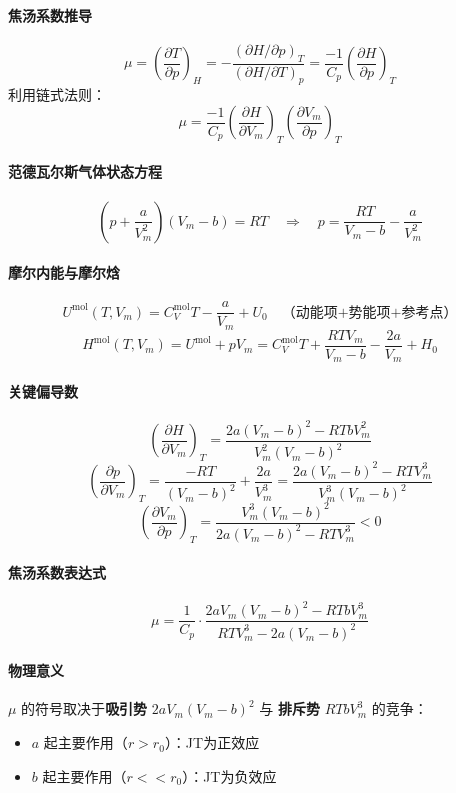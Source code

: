 \documentclass[UTF8]{ctexart}
\begin{document}
\paragraph{焦汤系数推导}
\[
\mu=\left(\frac{\partial T}{\partial p}\right)_H
=-\frac{(\partial H/\partial p)_T}{(\partial H/\partial T)_p}
=\frac{-1}{C_p}\left(\frac{\partial H}{\partial p}\right)_T
\]
利用链式法则：
\[
\mu=\frac{-1}{C_p}\left(\frac{\partial H}{\partial V_m}\right)_T
\left(\frac{\partial V_m}{\partial p}\right)_T
\]

\paragraph{范德瓦尔斯气体状态方程}
\[
\left(p+\frac{a}{V_m^2}\right)(V_m-b)=RT
\quad\Longrightarrow\quad
p=\frac{RT}{V_m-b}-\frac{a}{V_m^2}
\]

\paragraph{摩尔内能与摩尔焓}
\[
U^{\mathrm{mol}}(T,V_m)=C_V^{\mathrm{mol}}T-\frac{a}{V_m}+U_0
\quad\text{（动能项+势能项+参考点）}
\]
\[
H^{\mathrm{mol}}(T,V_m)=U^{\mathrm{mol}}+pV_m
=C_V^{\mathrm{mol}}T+\frac{RTV_m}{V_m-b}-\frac{2a}{V_m}+H_0
\]

\paragraph{关键偏导数}
\[
\left(\frac{\partial H}{\partial V_m}\right)_T
=\frac{2a(V_m-b)^2-RTbV_m^2}{V_m^2(V_m-b)^2}
\]
\[
\left(\frac{\partial p}{\partial V_m}\right)_T
=\frac{-RT}{(V_m-b)^2}+\frac{2a}{V_m^3}
=\frac{2a(V_m-b)^2-RTV_m^3}{V_m^3(V_m-b)^2}
\]
\[
\left(\frac{\partial V_m}{\partial p}\right)_T
=\frac{V_m^3(V_m-b)^2}{2a(V_m-b)^2-RTV_m^3}<0
\]

\paragraph{焦汤系数表达式}
\[
\boxed{\mu=\frac{1}{C_p}\cdot
\frac{2aV_m(V_m-b)^2-RTbV_m^3}{RTV_m^3-2a(V_m-b)^2}}
\]

\paragraph{物理意义}
$\mu$ 的符号取决于\textbf{吸引势} $2aV_m(V_m-b)^2$ 与 \textbf{排斥势} $RTbV_m^3$ 的竞争：
\begin{itemize}[leftmargin=2em]
  \item $a$ 起主要作用（$r>r_0$）：JT为正效应
  \item $b$ 起主要作用（$r<<r_0$）：JT为负效应
\end{itemize}
\end{document}
